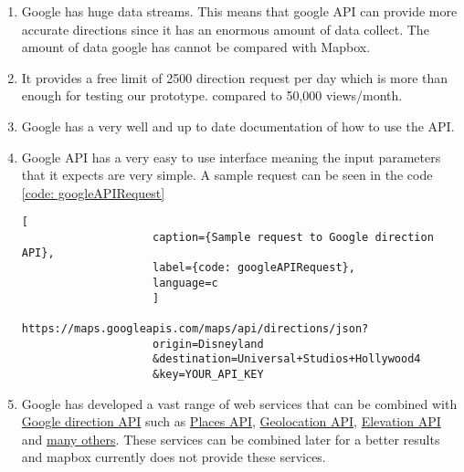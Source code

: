         \begin{enumerate}  
            \item 
                Google has huge data streams. This means that google API can provide more
                accurate directions since it has an enormous amount of data collect. The amount
                of data google has cannot be compared with Mapbox.
            \item
                It provides a free limit of 2500 direction request per day which is more than enough for testing our prototype.
                compared to  50,000 views/month.
            \item
                Google has a very well and up to date documentation of how to use the API.  
            \item
                Google API has a very easy to use interface meaning the input 
                parameters that it expects are very simple. 
                A sample request can be seen in the code \ref{code: googleAPIRequest}
                \begin{lstlisting}[
                    caption={Sample request to Google direction API}, 
                    label={code: googleAPIRequest},
                    language=c
                    ]
                    https://maps.googleapis.com/maps/api/directions/json?
                    origin=Disneyland
                    &destination=Universal+Studios+Hollywood4
                    &key=YOUR_API_KEY
                \end{lstlisting}   
            \item 
                Google has developed a vast range of web services that can be
                combined with \href{https://developers.google.com/maps/documentation/directions/start}
                {Google direction API} such as \href{https://developers.google.com/places/} 
                {Places API}, \href{https://developers.google.com/maps/documentation/geolocation/intro}
                {Geolocation API}, \href{https://developers.google.com/maps/documentation/elevation/start}
                {Elevation API} and \href{https://developers.google.com/places/documentation/} {many others}. 
                These services can be combined later for a better results and mapbox 
                currently does not provide these services. 
        \end{enumerate}